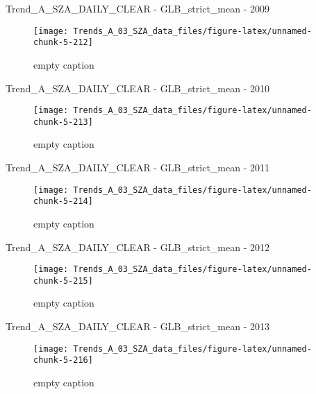 \documentclass[
  10pt,
  a4paper,oneside]{article}
\begin{document}
Trend\_A\_SZA\_DAILY\_CLEAR - GLB\_strict\_mean - 2009

\begin{figure}[!ht]

{\centering \texttt{[image: Trends\_A\_03\_SZA\_data\_files/figure-latex/unnamed-chunk-5-212]} 

}

\caption{ empty caption }\label{fig:unnamed-chunk-5-212}
\end{figure}

Trend\_A\_SZA\_DAILY\_CLEAR - GLB\_strict\_mean - 2010

\begin{figure}[!ht]

{\centering \texttt{[image: Trends\_A\_03\_SZA\_data\_files/figure-latex/unnamed-chunk-5-213]} 

}

\caption{ empty caption }\label{fig:unnamed-chunk-5-213}
\end{figure}

Trend\_A\_SZA\_DAILY\_CLEAR - GLB\_strict\_mean - 2011

\begin{figure}[!ht]

{\centering \texttt{[image: Trends\_A\_03\_SZA\_data\_files/figure-latex/unnamed-chunk-5-214]} 

}

\caption{ empty caption }\label{fig:unnamed-chunk-5-214}
\end{figure}

Trend\_A\_SZA\_DAILY\_CLEAR - GLB\_strict\_mean - 2012

\begin{figure}[!ht]

{\centering \texttt{[image: Trends\_A\_03\_SZA\_data\_files/figure-latex/unnamed-chunk-5-215]} 

}

\caption{ empty caption }\label{fig:unnamed-chunk-5-215}
\end{figure}

Trend\_A\_SZA\_DAILY\_CLEAR - GLB\_strict\_mean - 2013

\begin{figure}[!ht]

{\centering \texttt{[image: Trends\_A\_03\_SZA\_data\_files/figure-latex/unnamed-chunk-5-216]} 

}

\caption{ empty caption }\label{fig:unnamed-chunk-5-216}
\end{figure}
\end{document}
